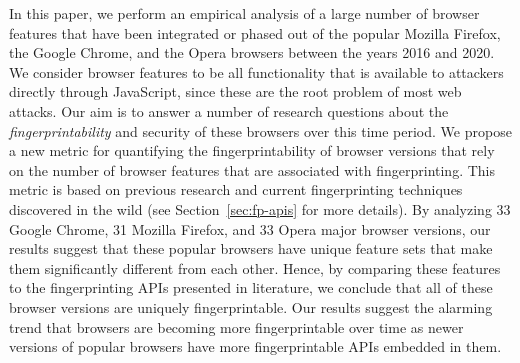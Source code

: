 
In this paper, we perform an empirical analysis of a large number of
browser features that have been integrated or phased out of the
popular Mozilla Firefox, the Google Chrome, and the Opera browsers between the
years 2016 and 2020. We consider browser features to be all
functionality that is available to attackers directly through
JavaScript, since these are the root problem of most web attacks. Our
aim is to answer a number of research questions about the
\textit{fingerprintability} and security of these browsers over this
time period. We propose a new metric for quantifying the
fingerprintability of browser versions that rely on the number of
browser features that are associated with fingerprinting. This metric is based on
previous research and current fingerprinting techniques discovered in
the wild (see Section~\ref{sec:fp-apis} for more details). By
analyzing 33 Google Chrome, 31 Mozilla Firefox, and 33 Opera major browser
versions, our results suggest that these popular browsers have unique
feature sets that make them significantly different from each
other. Hence, by comparing these features to the fingerprinting APIs
presented in literature, we conclude that all of these browser
versions are uniquely fingerprintable. Our results suggest the
alarming trend that browsers are becoming more fingerprintable over
time as newer versions of popular browsers have more fingerprintable
APIs embedded in them. 

